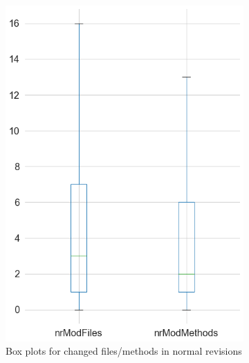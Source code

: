 \begin{figure}[H]
	\begin{subfigure}{0.5\textwidth}
		\centering
		\includegraphics[scale=0.3]{./src/data_analysis/normal_box_files.png}
		\caption{Box plots for changed files/methods in normal revisions}
	\end{subfigure}%
	\begin{subfigure}{0.5\textwidth}
		\centering

\end{subfigure}
\end{figure}
